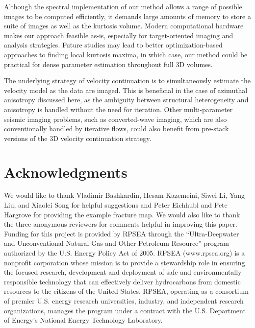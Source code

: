 Although the spectral implementation of our method allows a range of possible images to be computed efficiently, it demands large amounts of memory to store a suite of images as well as the kurtosis volume.  Modern computational hardware makes our approach feasible as-is, especially for target-oriented imaging and analysis strategies.  Future studies may lead to better optimization-based approaches to finding local kurtosis maxima, in which case, our method could be practical for dense parameter estimation throughout full 3D volumes.  

The underlying strategy of velocity continuation is to simultaneously estimate the velocity model as the data are imaged.  This is beneficial in the case of azimuthal anisotropy discussed here, as the ambiguity between structural heterogeneity and anisotropy is handled without the need for iteration.  Other multi-parameter seismic imaging problems, such as converted-wave imaging, which are also conventionally handled by iterative flows, could also benefit from pre-stack versions of the 3D velocity continuation strategy. 


\section{Acknowledgments}
We would like to thank Vladimir Bashkardin, Hesam Kazemeini, Siwei Li, Yang Liu, and Xiaolei Song for helpful suggestions and Peter Eichhubl and Pete Hargrove for providing the example fracture map.  We would also like to thank the three anonymous reviewers for comments helpful in improving this paper.  Funding for this project is provided by RPSEA through the ``Ultra-Deepwater and Unconventional Natural Gas and Other Petroleum Resource'' program authorized by the U.S. Energy Policy Act of 2005.  RPSEA (www.rpsea.org)  is a nonprofit corporation whose mission is to provide a stewardship role in ensuring the focused research, development and deployment of safe and environmentally responsible technology that can effectively deliver hydrocarbons from domestic resources to the citizens of the United States.  RPSEA, operating as a consortium of premier U.S. energy research universities, industry, and independent research organizations, manages the program under a contract with the U.S. Department of Energy's National Energy Technology Laboratory.


